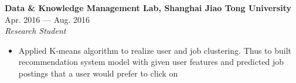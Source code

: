 \documentclass[margin,line,11pt]{res}
\begin{document}
\begin{resume}
{\small
{\bf\normalsize Data \& Knowledge Management Lab, Shanghai Jiao Tong University} \hfill Apr. 2016 --- Aug. 2016 \\
{\it Research Student} 
}
\begin{itemize}
\setlength{\itemsep}{0pt}
\setlength{\parskip}{0pt}
\setlength{\parsep}{0pt}
\item {\small Applied K-means algorithm to realize user and job clustering. Thus to built recommendation system model with given user features and predicted job postings that a user would prefer to click on}
\end{itemize}

{
\small
}



\end{resume}
\end{document}
